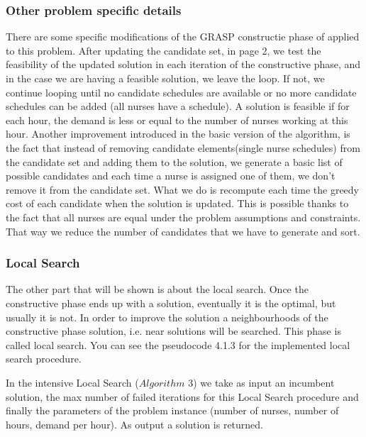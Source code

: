 \subsubsection{Other problem specific details}

There are some specific modifications of the GRASP constructie phase of \cite{grasp} applied to this problem. After updating the candidate set, in \cite{grasp} page 2, we test the feasibility of the updated solution in each iteration of the constructive phase, and in the case we are having a feasible solution, we leave the loop. If not, we continue looping until no candidate schedules are available or no more candidate schedules can be added (all nurses have a schedule). A solution is feasible if for each hour, the demand is less or equal to the number of nurses working at this hour. Another improvement introduced in the basic version of the algorithm, is the fact that instead of removing candidate elements(single nurse schedules) from the candidate set and adding them to the solution, we generate a basic list of possible candidates and each time a nurse is assigned one of them, we don't remove it from the candidate set. What we do is recompute each time the greedy cost of each candidate when the solution is updated. This is possible thanks to the fact that all nurses are equal under the problem assumptions and constraints. That way we reduce the number of candidates that we have to generate and sort.



\subsubsection{Local Search}

The other part that will be shown is about the local search. Once the constructive phase ends up with a solution, eventually it is the optimal, but usually it is not. In order to improve the solution a neighbourhoods of the constructive phase solution, i.e. near solutions will be searched. This phase is called local search. You can see the pseudocode 4.1.3 for the implemented local search procedure.

In the intensive Local Search ($Algorithm$ $3$) we take as input an incumbent solution, the max number of failed iterations for this Local Search procedure and finally the parameters of the problem instance (number of nurses, number of hours, demand per hour). As output a solution is returned.

